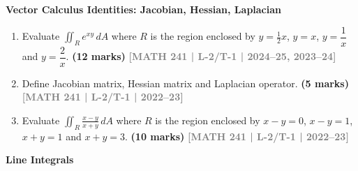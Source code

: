 \documentclass[12pt,a4paper]{article}
\newcommand{\yr}[1]{\hfill\textcolor{gray}{\small\textbf{[#1]}}}
\newcommand{\mk}[1]{\textcolor{orange!70!black}{\small\textbf{(#1 marks)}}}
\newcommand{\subtopic}[2]{%
  \vspace{10pt}
  \noindent\begin{tcolorbox}[colback=#1!8,colframe=#1,boxrule=0.6pt,arc=4pt,
    left=6pt,right=6pt,top=4pt,bottom=4pt]
    \small\bfseries\textcolor{#1}{#2}
  \end{tcolorbox}
  \vspace{2pt}
}
\begin{document}
\subtopic{cD}{Vector Calculus Identities: Jacobian, Hessian, Laplacian}
\label{sub:s4-identities}

\begin{enumerate}\item Evaluate $\displaystyle\iint_{R}e^{xy}\,dA$ where $R$ is the region enclosed by $y=\tfrac{1}{2}x$, $y=x$, $y=\dfrac{1}{x}$ and $y=\dfrac{2}{x}$.
\mk{12} \yr{MATH 241 | L-2/T-1 | 2024--25, 2023--24}

\item Define Jacobian matrix, Hessian matrix and Laplacian operator.
\mk{5} \yr{MATH 241 | L-2/T-1 | 2022--23}

\item Evaluate $\displaystyle\iint_{R}\frac{x-y}{x+y}\,dA$ where $R$ is the region enclosed by $x-y=0$, $x-y=1$, $x+y=1$ and $x+y=3$.
\mk{10} \yr{MATH 241 | L-2/T-1 | 2022--23}


\end{enumerate}

\subtopic{cD}{Line Integrals}
\label{sub:s4-lineint}
\end{document}
